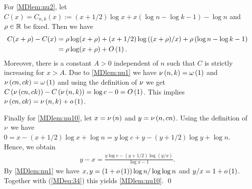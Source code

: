 For \ref{MDlem:nu2}, let $C(x)=C_{n,k}(x):=\left(x+1/2\right)\log x+x\left(\log n-\log k-1\right)-\log n$ and $\rho \in \mathbb{R}$ be fixed. Then we have
\begin{align*}
	C(x+\rho)-C(x)&=\rho\log(x+\rho)+\left(x+1/2\right)\log\left((x+\rho)/x\right)+\rho\left(\log n-\log k-1\right)
	\\
	&=\rho\log(x+\rho)+O\left(1\right).
\end{align*}
Moreover, there is a constant $A>0$ independent of $n$ such that $C$ is strictly increasing for $x>A$. Due to \ref{MDlem:nu1} we have $\nu\left(n, k\right)=\omega\left(1\right)$ and $\nu\left(cn, ck\right)=\omega\left(1\right)$ and using the definition of $\nu$ we get $C\left(\nu\left(cn, ck\right)\right)-C\left(\nu\left(n, k\right)\right)=\log c-0=O\left(1\right)$. This implies $\nu\left(cn, ck\right)=\nu\left(n, k\right)+o\left(1\right)$.

Finally for \ref{MDlem:nu10}, let $x=\nu\left(n\right)$ and $y=\nu\left(n, cn\right)$. Using the definition of $\nu$ we have $0=x-(x+1/2)\log x+\log n=y\log c+y-(y+1/2)\log y+\log n$. Hence, we obtain
\begin{align}\label{MDeq:34}
	y-x=\frac{y\log c-\left(y+1/2\right)\log \left(y/x\right)}{\log x-1}.
\end{align}
By \ref{MDlem:nu1} we have $x,y=\left(1+o\left(1\right)\right)\log n/\log\log n$ and $y/x=1+o\left(1\right)$. Together with (\ref{MDeq:34}) this yields \ref{MDlem:nu10}.
\qed

